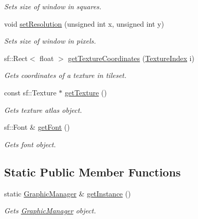 \begin{DoxyCompactItemize}
\begin{DoxyCompactList}\small\item\em Sets size of window in squares. \end{DoxyCompactList}\item 
void \mbox{\hyperlink{class_graphic_manager_a1ab7417cbc4168cdb00f9439ccf57e4c}{set\+Resolution}} (unsigned int x, unsigned int y)
\begin{DoxyCompactList}\small\item\em Sets size of window in pixels. \end{DoxyCompactList}\item 
sf\+::\+Rect$<$ float $>$ \mbox{\hyperlink{class_graphic_manager_a35a21b74d38600410515b62c7ef63c9f}{get\+Texture\+Coordinates}} (\mbox{\hyperlink{class_graphic_manager_a8c72b253489f6f51d548812d566ed56e}{Texture\+Index}} i)
\begin{DoxyCompactList}\small\item\em Gets coordinates of a texture in tileset. \end{DoxyCompactList}\item 
const sf\+::\+Texture $\ast$ \mbox{\hyperlink{class_graphic_manager_a1606d81941e83aab67d178ce6866550f}{get\+Texture}} ()
\begin{DoxyCompactList}\small\item\em Gets texture atlas object. \end{DoxyCompactList}\item 
sf\+::\+Font \& \mbox{\hyperlink{class_graphic_manager_ab11f88514adc3dbe6912438c0280b267}{get\+Font}} ()
\begin{DoxyCompactList}\small\item\em Gets font object. \end{DoxyCompactList}\end{DoxyCompactItemize}
\subsection*{Static Public Member Functions}
\begin{DoxyCompactItemize}
\item 
static \mbox{\hyperlink{class_graphic_manager}{Graphic\+Manager}} \& \mbox{\hyperlink{class_graphic_manager_a5ab0713b781b88adb5906db47b5a1d45}{get\+Instance}} ()
\begin{DoxyCompactList}\small\item\em Gets \mbox{\hyperlink{class_graphic_manager}{Graphic\+Manager}} object. \end{DoxyCompactList}\end{DoxyCompactItemize}


